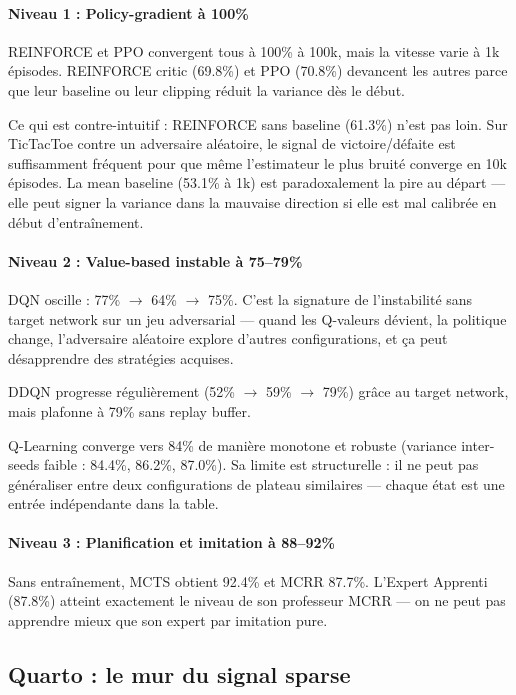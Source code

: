 \documentclass[12pt,a4paper]{article}
\begin{document}
\paragraph{Niveau 1 : Policy-gradient à 100\%}

REINFORCE et PPO convergent tous à 100\% à 100k, mais la vitesse varie à 1k épisodes. REINFORCE critic (69.8\%) et PPO (70.8\%) devancent les autres parce que leur baseline ou leur clipping réduit la variance dès le début.

Ce qui est contre-intuitif : REINFORCE sans baseline (61.3\%) n'est pas loin. Sur TicTacToe contre un adversaire aléatoire, le signal de victoire/défaite est suffisamment fréquent pour que même l'estimateur le plus bruité converge en 10k épisodes. La mean baseline (53.1\% à 1k) est paradoxalement la pire au départ — elle peut signer la variance dans la mauvaise direction si elle est mal calibrée en début d'entraînement.

\paragraph{Niveau 2 : Value-based instable à 75--79\%}

DQN oscille : 77\% $\to$ 64\% $\to$ 75\%. C'est la signature de l'instabilité sans target network sur un jeu adversarial — quand les Q-valeurs dévient, la politique change, l'adversaire aléatoire explore d'autres configurations, et ça peut désapprendre des stratégies acquises.

DDQN progresse régulièrement (52\% $\to$ 59\% $\to$ 79\%) grâce au target network, mais plafonne à 79\% sans replay buffer.

Q-Learning converge vers 84\% de manière monotone et robuste (variance inter-seeds faible : 84.4\%, 86.2\%, 87.0\%). Sa limite est structurelle : il ne peut pas généraliser entre deux configurations de plateau similaires — chaque état est une entrée indépendante dans la table.

\paragraph{Niveau 3 : Planification et imitation à 88--92\%}

Sans entraînement, MCTS obtient 92.4\% et MCRR 87.7\%. L'Expert Apprenti (87.8\%) atteint exactement le niveau de son professeur MCRR — on ne peut pas apprendre mieux que son expert par imitation pure.

\subsection{Quarto : le mur du signal sparse}
\end{document}

